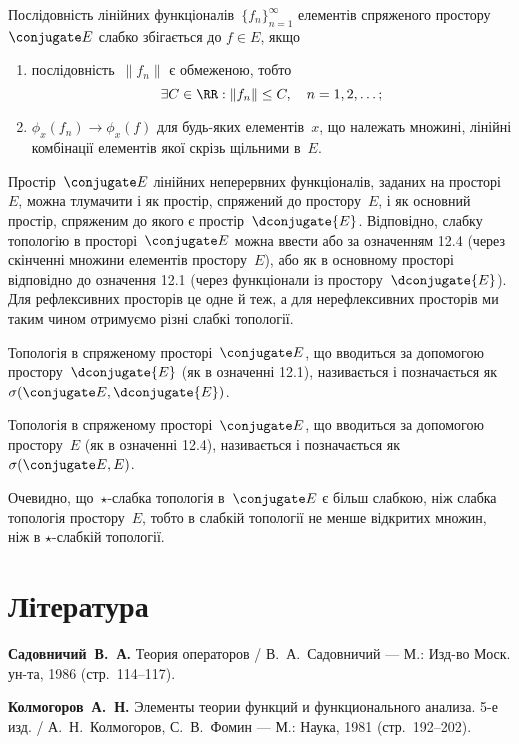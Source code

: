 \begin{theorem}
Послідовність лінійних функціоналів~$\{f_n\}_{n = 1}^\infty$
елементів спряженого простору~$\conjugate E$ слабко збігається до
$f \in E$, якщо
\begin{enumerate}
\item послідовність~$\|f_n\|$ є обмеженою, тобто
\begin{equation*}
\exists C \in \RR: \|f_n\| \le C, \quad n = 1, 2, \dots;
\end{equation*}
\item $\phi_x(f_n) \to \phi_x(f)$ для будь-яких елементів~$x$, що
належать множині, лінійні комбінації елементів якої скрізь
щільними в~$E$.
\end{enumerate}
\end{theorem}

\begin{remark}
Простір~$\conjugate E$ лінійних неперервних функціоналів, заданих
на просторі~$E$, можна тлумачити і як простір, спряжений до
простору~$E$, і як основний простір, спряженим до якого є
простір~$\dconjugate{E}$. Відповідно, слабку топологію в просторі~$\conjugate E$
можна ввести або за означенням 12.4 (через скінченні
множини елементів простору~$E$), або як в основному
просторі відповідно до означення 12.1 (через функціонали із
простору~$\dconjugate{E}$). Для рефлексивних просторів це одне й теж, а
для нерефлексивних просторів ми таким чином отримуємо
різні слабкі топології.
\end{remark}

\begin{definition}
Топологія в спряженому просторі~$\conjugate E$, що
вводиться за допомогою простору~$\dconjugate{E}$ (як в означенні 12.1),
називається  і позначається як~$\sigma(\conjugate E, \dconjugate{E})$.
\end{definition}

\begin{definition}
Топологія в спряженому просторі~$\conjugate E$, що
вводиться за допомогою простору~$E$ (як в означенні 12.4),
називається  і позначається як~$\sigma(\conjugate E, E)$.
\end{definition}

\begin{remark}
Очевидно, що~$\star$-слабка топологія в~$\conjugate E$ є
більш слабкою, ніж слабка топологія простору~$E$, тобто в
слабкій топології не менше відкритих множин, ніж в
$\star$-слабкій топології.
\end{remark}

\section{Література}

\begin{enumerate}[label={[\arabic*]}]
\item \textbf{Садовничий~В.~А.}
Теория операторов /
В.~А.~Садовничий ---
М.: Изд-во Моск. ун-та, 1986 (стр.~114--117).
\item \textbf{Колмогоров~А.~Н.}
Элементы теории функций и функционального анализа. 5-е изд. /
А.~Н.~Колмогоров, С.~В.~Фомин ---
М.: Наука, 1981 (стр.~192--202).
\end{enumerate}
